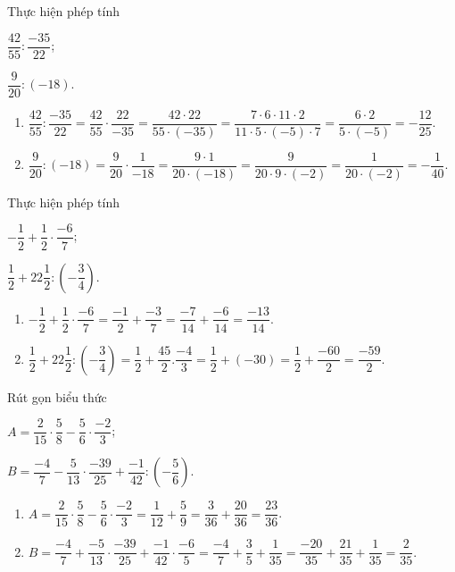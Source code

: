 \begin{vd}
	Thực hiện phép tính
\begin{listEX}[2]
	\item $\dfrac{42}{55} : \dfrac{-35}{22}$;
	\item $\dfrac{9}{20} : (-18)$. 
\end{listEX}
\loigiai
{\begin{enumerate}
	\item	$\dfrac{42}{55} : \dfrac{-35}{22} = \dfrac{42}{55} \cdot \dfrac{22}{-35} = \dfrac{42 \cdot 22}{55 \cdot (-35)} = \dfrac{7 \cdot 6 \cdot 11 \cdot 2}{11 \cdot 5 \cdot (-5) \cdot 7}= \dfrac{6 \cdot 2}{5 \cdot (-5)} = - \dfrac{12}{25}$.
	\item $\dfrac{9}{20} : (-18) = \dfrac{9}{20} \cdot \dfrac{1}{-18} = \dfrac{9 \cdot 1}{20 \cdot (-18)} = \dfrac{9}{20 \cdot 9 \cdot (-2)} = \dfrac{1}{20 \cdot (-2)} = - \dfrac{1}{40}$.
			\end{enumerate}
	}
\end{vd}
 
\begin{vd}
	Thực hiện phép tính
	\begin{listEX}[2]
		\item $-\dfrac{1}{2} + \dfrac{1}{2} \cdot \dfrac{-6}{7}$;
		\item $\dfrac{1}{2} + 22 \dfrac{1}{2}: \left( -\dfrac{3}{4}\right) $. 
	\end{listEX}
	\loigiai
	{\begin{enumerate}
			\item $-\dfrac{1}{2} + \dfrac{1}{2} \cdot \dfrac{-6}{7}= \dfrac{-1}{2}+ \dfrac{-3}{7} = \dfrac{-7}{14}+ \dfrac{-6}{14}= \dfrac{-13}{14}$.
			\item $\dfrac{1}{2} + 22 \dfrac{1}{2}: \left( -\dfrac{3}{4}\right) = \dfrac{1}{2}+ \dfrac{45}{2}.\dfrac{-4}{3} =\dfrac{1}{2}+ (-30) = \dfrac{1}{2}+ \dfrac{-60}{2}= \dfrac{-59}{2}$. 
		\end{enumerate}
	}
\end{vd}

\begin{vd}
Rút gọn biểu thức
	\begin{listEX}[2]
		\item $A= \dfrac{2}{15} \cdot \dfrac{5}{8} - \dfrac{5}{6} \cdot \dfrac{-2}{3}$;
		\item $B= \dfrac{-4}{7} - \dfrac{5}{13} \cdot \dfrac{-39}{25} + \dfrac{-1}{42}: \left( - \dfrac{5}{6} \right) $.
	\end{listEX}
	\loigiai
	{\begin{enumerate}
			\item $A= \dfrac{2}{15} \cdot \dfrac{5}{8} - \dfrac{5}{6} \cdot \dfrac{-2}{3} = \dfrac{1}{12} + \dfrac{5}{9} = \dfrac{3}{36} + \dfrac{20}{36} = \dfrac{23}{36}$.
					\item $B = \dfrac{-4}{7} + \dfrac{-5}{13} \cdot \dfrac{-39}{25} + \dfrac{-1}{42} \cdot \dfrac{-6}{5}
			= \dfrac{-4}{7} + \dfrac{3}{5} + \dfrac{1}{35}
			 = \dfrac{-20}{35} + \dfrac{21}{35} + \dfrac{1}{35} = \dfrac{2}{35}.$
		\end{enumerate}
	}
\end{vd}

